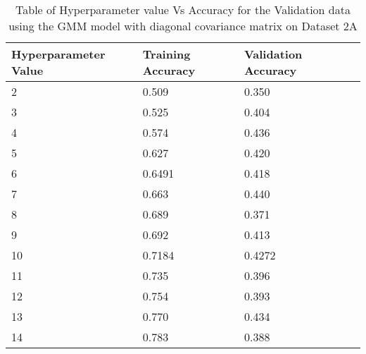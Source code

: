 \begin{table}[H]
\centering
\begin{longtable}{l l l l}
\hline
\hline
\textbf{Hyperparameter Value} & \textbf{Training Accuracy} & \textbf{Validation Accuracy}\\
\hline
\hline
2 & 0.509 & 0.350\\
3 & 0.525 & 0.404\\
4 & 0.574 & 0.436\\
5 & 0.627 & 0.420\\
6 & 0.6491 & 0.418\\
7 & 0.663 & 0.440\\
8 & 0.689 & 0.371\\
9 & 0.692 & 0.413\\
10 & 0.7184 & 0.4272\\
11 & 0.735 & 0.396\\
12 & 0.754 & 0.393\\
13 & 0.770 & 0.434\\
14 & 0.783 & 0.388\\
\hline
\end{longtable}
\caption{Table of Hyperparameter value Vs Accuracy for the Validation data using the GMM model with diagonal covariance matrix on Dataset 2A}
\label{tab:acc2a}
\end{table}
